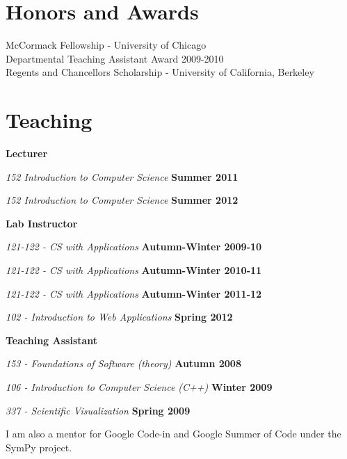 \documentclass[margin,line]{res}
\newenvironment{list1}{
  \begin{list}{\ding{113}}{%
      \setlength{\itemsep}{0in}
      \setlength{\parsep}{0in} \setlength{\parskip}{0in}
      \setlength{\topsep}{0in} \setlength{\partopsep}{0in} 
      \setlength{\leftmargin}{0.17in}}}{\end{list}}
\begin{document}
\begin{resume}
\section{\sc Honors and Awards} 

McCormack Fellowship - University of Chicago\\
Departmental Teaching Assistant Award 2009-2010\\
Regents and Chancellors Scholarship - University of California, Berkeley\\

\section {\sc Teaching}

{\bf Lecturer}
\begin{list1}
\item[] {\em 152 Introduction to Computer Science} \hfill {\bf Summer 2011}
\item[] {\em 152 Introduction to Computer Science} \hfill {\bf Summer 2012}
\end{list1}

{\bf Lab Instructor}
\begin{list1}
\item[] {\em 121-122 - CS with Applications}  \hfill {\bf Autumn-Winter 2009-10}
\item[] {\em 121-122 - CS with Applications}  \hfill {\bf Autumn-Winter 2010-11}
\item[] {\em 121-122 - CS with Applications}  \hfill {\bf Autumn-Winter 2011-12}
\item[] {\em 102 - Introduction to Web Applications}  \hfill {\bf Spring 2012}
\end{list1}

{\bf Teaching Assistant}
\begin{list1}
\item[] {\em 153 - Foundations of Software (theory)} \hfill {\bf Autumn 2008}
\item[] {\em 106 - Introduction to Computer Science (C++)} \hfill {\bf Winter 2009}
\item[] {\em 337 - Scientific Visualization} \hfill {\bf Spring 2009}
\end{list1}

I am also a mentor for Google Code-in and Google Summer of Code under the SymPy project. 


\end{resume}
\end{document}
